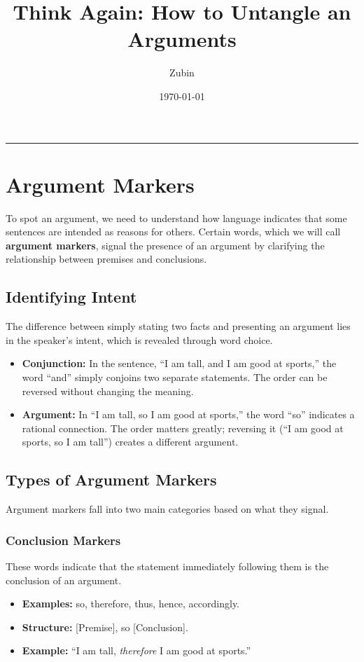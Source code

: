 \documentclass[12pt]{article}
\title{Think Again: How to Untangle an Arguments}
\author{Zubin}
\date{\today}
\newcommand{\separator}{\noindent\rule{\linewidth}{1pt}}
\begin{document}
\maketitle

\tableofcontents

\newpage

\separator

\section{Argument Markers}
To spot an argument, we need to understand how language indicates that some sentences are intended as reasons for others. Certain words, which we will call \textbf{argument markers}, signal the presence of an argument by clarifying the relationship between premises and conclusions.

\subsection{Identifying Intent}
The difference between simply stating two facts and presenting an argument lies in the speaker's intent, which is revealed through word choice.
\begin{itemize}
    \item \textbf{Conjunction:} In the sentence, ``I am tall, and I am good at sports,'' the word ``and'' simply conjoins two separate statements. The order can be reversed without changing the meaning.
    \item \textbf{Argument:} In ``I am tall, so I am good at sports,'' the word ``so'' indicates a rational connection. The order matters greatly; reversing it (``I am good at sports, so I am tall'') creates a different argument.
\end{itemize}

\subsection{Types of Argument Markers}
Argument markers fall into two main categories based on what they signal.

\subsubsection{Conclusion Markers}
These words indicate that the statement immediately following them is the conclusion of an argument.
\begin{itemize}
    \item \textbf{Examples:} so, therefore, thus, hence, accordingly.
    \item \textbf{Structure:} [Premise], so [Conclusion].
    \item \textbf{Example:} ``I am tall, \textit{therefore} I am good at sports.''
\end{itemize}
\end{document}
